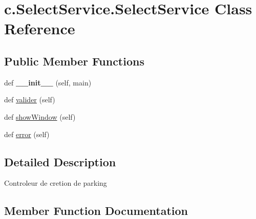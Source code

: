 \hypertarget{classc_1_1_select_service_1_1_select_service}{}\section{c.\+Select\+Service.\+Select\+Service Class Reference}
\label{classc_1_1_select_service_1_1_select_service}
\subsection*{Public Member Functions}
\begin{DoxyCompactItemize}
\item 
\hypertarget{classc_1_1_select_service_1_1_select_service_aba8f570703132c8ef4755e8f2b42a4f0}{}def {\bfseries \+\_\+\+\_\+init\+\_\+\+\_\+} (self, main)\label{classc_1_1_select_service_1_1_select_service_aba8f570703132c8ef4755e8f2b42a4f0}

\item 
def \hyperlink{classc_1_1_select_service_1_1_select_service_aa86386c9d3123aee25c713e0400d2e9d}{valider} (self)
\item 
def \hyperlink{classc_1_1_select_service_1_1_select_service_a481257e5c007bc5ca58d7d41c58f9f72}{show\+Window} (self)
\item 
def \hyperlink{classc_1_1_select_service_1_1_select_service_a83f61007a826409a45aae5267f0b693f}{error} (self)
\end{DoxyCompactItemize}


\subsection{Detailed Description}
\begin{DoxyVerb}Controleur de cretion de parking
\end{DoxyVerb}
 

\subsection{Member Function Documentation}
\hypertarget{classc_1_1_select_service_1_1_select_service_a83f61007a826409a45aae5267f0b693f}{}
